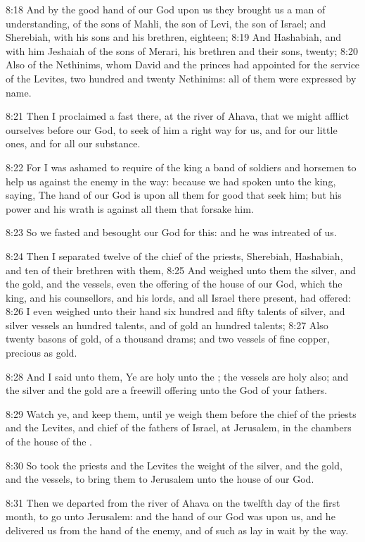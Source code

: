 8:18 And by the good hand of our God upon us they brought us a man of
understanding, of the sons of Mahli, the son of Levi, the son of
Israel; and Sherebiah, with his sons and his brethren, eighteen; 8:19
And Hashabiah, and with him Jeshaiah of the sons of Merari, his
brethren and their sons, twenty; 8:20 Also of the Nethinims, whom
David and the princes had appointed for the service of the Levites,
two hundred and twenty Nethinims: all of them were expressed by name.

8:21 Then I proclaimed a fast there, at the river of Ahava, that we
might afflict ourselves before our God, to seek of him a right way for
us, and for our little ones, and for all our substance.

8:22 For I was ashamed to require of the king a band of soldiers and
horsemen to help us against the enemy in the way: because we had
spoken unto the king, saying, The hand of our God is upon all them for
good that seek him; but his power and his wrath is against all them
that forsake him.

8:23 So we fasted and besought our God for this: and he was intreated
of us.

8:24 Then I separated twelve of the chief of the priests, Sherebiah,
Hashabiah, and ten of their brethren with them, 8:25 And weighed unto
them the silver, and the gold, and the vessels, even the offering of
the house of our God, which the king, and his counsellors, and his
lords, and all Israel there present, had offered: 8:26 I even weighed
unto their hand six hundred and fifty talents of silver, and silver
vessels an hundred talents, and of gold an hundred talents; 8:27 Also
twenty basons of gold, of a thousand drams; and two vessels of fine
copper, precious as gold.

8:28 And I said unto them, Ye are holy unto the \LORD; the vessels are
holy also; and the silver and the gold are a freewill offering unto
the \LORD God of your fathers.

8:29 Watch ye, and keep them, until ye weigh them before the chief of
the priests and the Levites, and chief of the fathers of Israel, at
Jerusalem, in the chambers of the house of the \LORD.

8:30 So took the priests and the Levites the weight of the silver, and
the gold, and the vessels, to bring them to Jerusalem unto the house
of our God.

8:31 Then we departed from the river of Ahava on the twelfth day of
the first month, to go unto Jerusalem: and the hand of our God was
upon us, and he delivered us from the hand of the enemy, and of such
as lay in wait by the way.

